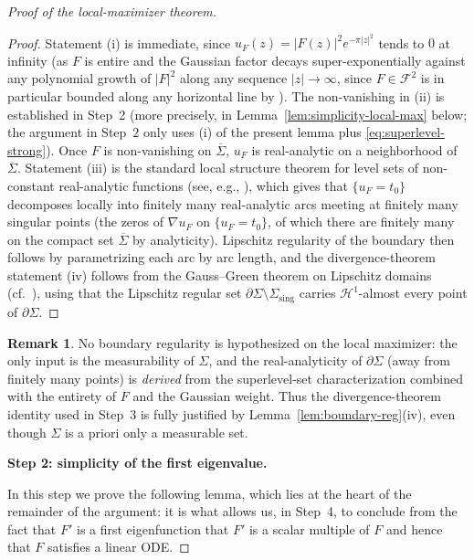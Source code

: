 \documentclass[a4paper,11pt,reqno]{amsart}
\numberwithin{equation}{section}
\theoremstyle{plain} %
\theoremstyle{definition} %
\newtheorem{remark}{Remark}[section]
\theoremstyle{remark}
\begin{document}
\begin{proof}[Proof of the local-maximizer theorem]
\begin{proof}
Statement (i) is immediate, since \(u_F(z)=|F(z)|^2 e^{-\pi|z|^2}\) tends to
\(0\) at infinity (as \(F\) is entire and the Gaussian factor decays
super-exponentially against any polynomial growth of \(|F|^2\) along any
sequence \(|z|\to\infty\), since \(F\in\mathcal F^2\) is in particular bounded
along any horizontal line by \cite[Ch.~1]{Folland}). The non-vanishing in
(ii) is established in Step~2 (more precisely, in
Lemma~\ref{lem:simplicity-local-max} below; the argument in Step~2 only uses
(i) of the present lemma plus \eqref{eq:superlevel-strong}). Once \(F\) is
non-vanishing on \(\overline\Sigma\), \(u_F\) is real-analytic on a
neighborhood of \(\overline\Sigma\). Statement (iii) is the standard local
structure theorem for level sets of non-constant real-analytic functions
(see, e.g., \cite{Krantz-Parks-Primer,Lojasiewicz}), which gives that
\(\{u_F=t_0\}\) decomposes locally into finitely many real-analytic arcs
meeting at finitely many singular points (the zeros of \(\nabla u_F\) on
\(\{u_F=t_0\}\), of which there are finitely many on the compact set
\(\overline\Sigma\) by analyticity). Lipschitz regularity of the boundary
then follows by parametrizing each arc by arc length, and the
divergence-theorem statement (iv) follows from the Gauss--Green theorem on
Lipschitz domains
(cf.\ \cite{Evans-Gariepy}), using that the Lipschitz regular set
\(\partial\Sigma\setminus \Sigma_{\mathrm{sing}}\) carries
\(\mathcal H^1\)-almost every point of \(\partial\Sigma\).
\end{proof}

\begin{remark}\label{rem:reg-vs-hypothesis}
No boundary regularity is hypothesized on the local maximizer: the only input
is the measurability of \(\Sigma\), and the real-analyticity of
\(\partial\Sigma\) (away from finitely many points) is \emph{derived} from
the superlevel-set characterization combined with the entirety of \(F\) and
the Gaussian weight. Thus the divergence-theorem identity used in Step~3 is
fully justified by Lemma~\ref{lem:boundary-reg}(iv), even though \(\Sigma\)
is a priori only a measurable set.
\end{remark}

\medskip
\noindent
{\bf Step 2: simplicity of the first eigenvalue.}

In this step we prove the following lemma, which lies at the heart of the
remainder of the argument: it is what allows us, in Step~4, to conclude from
the fact that \(F'\) is a first eigenfunction that \(F'\) is a scalar multiple
of \(F\) and hence that \(F\) satisfies a linear ODE.


\end{proof}
\end{document}
